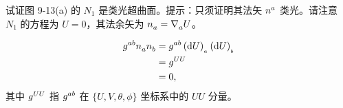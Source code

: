 \begin{xiti}
	\item 试证图 9-13(a) 的 $N_1$ 是类光超曲面。提示：只须证明其法矢 $\tensor{n}{^a}$ 类光。请注意 $N_1$ 的方程为 $U=0$，其法余矢为 $\tensor{n}{_a} = \Nabla{a} U$。
	\begin{zm}
		\begin{align*}
			\tensor{g}{^a^b} \tensor{n}{_a} \tensor{n}{_b} &= \tensor{g}{^a^b} \tensord{U}{_a} \tensord{U}{_b}\\
			&= \tensor{g}{^U^U}\\
			&= 0,
		\end{align*}
		其中 $\tensor{g}{^U^U}$ 指 $\tensor{g}{^a^b}$ 在 $\{ U, V, \theta, \phi \}$ 坐标系中的 $UU$ 分量。
	\end{zm}
\end{xiti}
